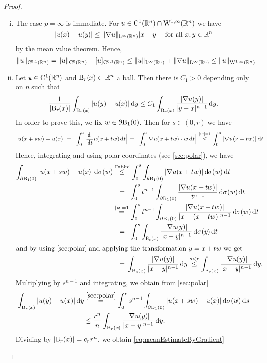 \begin{proof}
  \begin{enumerate}[i)]
    \item The case $p = \infty$ is immediate.
      For $u \in \mathrm{C}^1(\mathbb{R}^n) \cap \mathrm{W}^{1,\infty}(\mathbb{R}^n)$ we have
      $$
      |u(x) - u(y)| \leq \| \nabla u\|_{\mathrm{L}^\infty(\mathbb{R}^n)} | x - y| \quad\text{for all } x, y \in \mathbb{R}^n
      $$
      by the mean value theorem.
      Hence,
      $$
      \|u\|_{\mathrm{C}^{0,1}(\mathbb{R}^n)}
      = \| u\|_{\mathrm{C}^0(\mathbb{R}^n)} + [u ]_{\mathrm{C}^{0,1}(\mathbb{R}^n)}
      \leq \|u\|_{\mathrm{L}^\infty(\mathbb{R}^n)} + \|\nabla u\|_{\mathrm{L}^\infty(\mathbb{R}^n)}
      \leq \| u\|_{\mathrm{W}^{1,\infty}(\mathbb{R}^n)}
      $$

    \item Let $u \in \mathrm{C}^1(\mathbb{R}^n)$ and $\mathrm{B}_r(x) \subset \mathbb{R}^n$ a ball.
      Then there is $C_1 > 0$ depending only on $n$ such that
      \begin{equation}
        \label{eq:meanEstimateByGradient}
        \frac{1}{|\mathrm{B}_r(x)|} \int_{\mathrm{B}_r(x)} |u(y) - u(x)| \, {\operatorname{d}\!{y}}
        \leq C_1 \int_{\mathrm{B}_r(x)} \frac{|\nabla u(y)|}{|y - x|^{n - 1}} \, {\operatorname{d}\!{y}}.
      \end{equation}
      In order to prove this, we fix $w \in \partial\mathrm{B}_1(0)$.
      Then for $s \in (0,r)$ we have
      $$
      |u(x + sw) - u(x)|
      = \Big| \int_0^s \frac{\, {\operatorname{d}\!{\ }}}{\, {\operatorname{d}\!{t}}} u(x + tw) \, {\operatorname{d}\!{t}} \Big|
      = \Big| \int_0^s \nabla u(x + tw) \cdot w \, {\operatorname{d}\!{t}}  \Big|
      \overset{|w| = 1}{\leq} \int_0^s |\nabla u(x + tw)| \, {\operatorname{d}\!{t}}
      $$
      Hence, integrating and using polar coordinates (see \ref{sec:polar}), we have
      \begin{align*}
        \int_{\partial\BB_1(0)} | u(x + sw) - u(x)| \d \sigma(w)
        &\overset{\text{Fubini}}{\leq} \int_0^s \int_{\partial\BB_1(0)} |\nabla u(x + t w)| \d\sigma(w) \d t \\
        &\;\;\,= \;\;\int_0^s t^{n - 1} \int_{\partial\BB_1(0)} \frac{|\nabla u(x + tw)|}{t^{n - 1}} \d \sigma(w) \d t \\
        &\overset{|w| = 1}{=} \int_0^s t^{n - 1} \int_{\partial\BB_1(0)} \frac{|\nabla u(x + tw)|}{|x - (x + tw)|^{n - 1}} \d \sigma(w) \d t \\
        &\;\;\,= \;\;\int_0^s \int_{\BB_t(x)} \frac{|\nabla u(y)|}{|x - y|^{n - 1}} \d \sigma(y) \d t \\
        \intertext{and by using \ref{sec:polar} and applying the transformation $y = x + tw$ we get}
        &\;\;\,= \,\int_{\BB_s(x)} \frac{|\nabla u(y)|}{|x - y|^{n - 1}} \d y 
        \overset{s < r}{\leq} \int_{\BB_r(x)} \frac{|\nabla u(y)|}{|x - y|^{n - 1}} \d y.
      \end{align*}
      Multiplying by $s^{n - 1}$ and integrating, we obtain from \ref{sec:polar}
      \begin{align*}
      \int_{\mathrm{B}_r(x)} |u(y) - u(x)| \, {\operatorname{d}\!{y}}
        &\overset{\ref{sec:polar}}{=} \int_0^r s^{n - 1} \int_{\partial\mathrm{B}_1(0)} |u(x + sw) - u(x)| \, {\operatorname{d}\!{\sigma}}(w) \, {\operatorname{d}\!{s}} \\
        &\leq \frac{r^n}{n} \int_{\mathrm{B}_r(x)} \frac{|\nabla u(y)|}{|x - y|^{n - 1}} \, {\operatorname{d}\!{y}}.
      \end{align*}
      Dividing by $|\mathrm{B}_r(x)| = c_n r^n$, we obtain \eqref{eq:meanEstimateByGradient}


\end{enumerate}
\end{proof}
